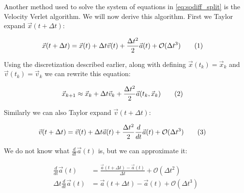 \documentclass[reprint,english,notitlepage]{revtex4-1}  %
\newcommand\numberthis{\addtocounter{equation}{1}\tag{\theequation}}
\begin{document}



Another method used to solve the system of equations in \eqref{eq:sodiff_split} is the Velocity Verlet algorithm. We will now derive this algorithm. First we Taylor expand $\vec{x}(t + \Delta t)$:

\begin{align*}
\vec{x}(t + \Delta t) &= \vec{x}(t) + \Delta t \vec{v}(t) + \frac{\Delta t^2}{2} \vec{a}(t) + \mathcal{O}(\Delta t^3) \numberthis \label{eq:so_taylorx}
\end{align*}

Using the discretization described earlier, along with defining $\vec{x}(t_k) = \vec{x}_k$ and $\vec{v}(t_k) = \vec{v}_k$ we can rewrite this equation: 

\begin{align*}
\vec{x}_{k + 1} &\approx \vec{x}_k + \Delta t \vec{v}_k + \frac{\Delta t^2}{2} \vec{a}(t_k,\vec{x}_k) \numberthis \label{eq:so_taylorx_disc}
\end{align*}

Similarly we can also Taylor expand $\vec{v}(t+\Delta t)$:

\begin{align*}
\vec{v}(t+\Delta t) &= \vec{v}(t) + \Delta t \vec{a}(t) + \frac{\Delta t^2}{2} \frac{d}{dt} \vec{a}(t) + \mathcal{O}(\Delta t^3) \numberthis \label{eq:so_taylorv}
\end{align*}

We do not know what $\frac{d}{dt} \vec{a}(t)$ is, but we can approximate it:

\begin{align*}
\frac{d}{dt}\vec{a}(t) &= \frac{\vec{a}(t+\Delta t) - \vec{a}(t)}{\Delta t} + \mathcal{O}(\Delta t^2) \\
\Delta t \frac{d}{dt} \vec{a}(t) &= \vec{a}(t+ \Delta t ) - \vec{a}(t) + \mathcal{O}(\Delta t^3) 
\end{align*}
\end{document}
